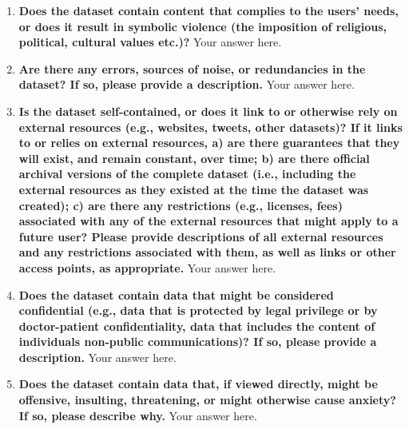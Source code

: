\documentclass{article}
\begin{document}
\begin{enumerate}[leftmargin=0.65cm]
        \item \textbf{Does the dataset contain content that complies to the users' needs, or does it result in symbolic violence (the imposition of religious, political, cultural values etc.)?}
        \newline 
        Your answer here.
        \newline 
        
        \item \textbf{Are there any errors, sources of noise, or redundancies in the dataset? If so, please provide a description.}
        \newline 
        Your answer here.
        \newline 
        
        \item \textbf{Is the dataset self-contained, or does it link to or otherwise rely on external resources (e.g., websites, tweets, other datasets)? If it links to or relies on external resources, a) are there guarantees that they will exist, and remain constant, over time; b) are there official archival versions of the complete dataset (i.e., including the external resources as they existed at the time the dataset was created); c) are there any restrictions (e.g., licenses, fees) associated with any of the external resources that might apply to a future user? Please provide descriptions of all external resources and any restrictions associated with them, as well as links or other access points, as appropriate.}
        \newline 
        Your answer here.
        \newline 
        
        \item \textbf{Does the dataset contain data that might be considered confidential (e.g., data that is protected by legal privilege or by doctor-patient confidentiality, data that includes the content of individuals non-public communications)? If so, please provide a description.}
        \newline 
        Your answer here.
        \newline 
        
        \item \textbf{Does the dataset contain data that, if viewed directly, might be offensive, insulting, threatening, or might otherwise cause anxiety? If so, please describe why.}
        \newline 
        Your answer here.
        \newline 
        

\end{enumerate}
\end{document}
